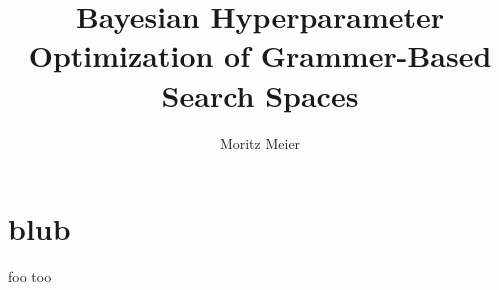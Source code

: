 \documentclass[english]{article}
\begin{document}
  

\title{Bayesian Hyperparameter Optimization of Grammer-Based Search Spaces}
\author{Moritz Meier}

\section{blub}
foo too
\end{document}
